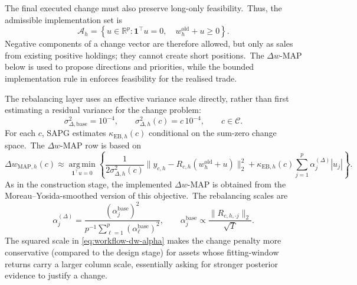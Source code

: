 \documentclass[11pt]{article}
\newcommand{\argmin}{\operatorname*{arg\,min}}
\newcommand{\one}{\mathbf{1}}
\begin{document}
The final executed change must also preserve long-only feasibility.\ Thus, the admissible implementation set is
\begin{equation}
  \mathcal A_h
  =
  \left\{
  u\in\mathbb R^p:
  \one^\top u=0,
  \quad
  w_h^{\mathrm{old}}+u\geq0
  \right\}.
  \label{eq:workflow-admissible-change-set}
\end{equation}
Negative components of a change vector are therefore allowed, but only as sales from existing positive holdings; they cannot create short positions.\ The \(\Delta w\)-MAP below is used to propose directions and priorities, while the bounded implementation rule in  enforces feasibility for the realised trade.

The rebalancing layer uses an effective variance scale directly, rather than first estimating a residual variance for the change problem:\
\begin{equation}
  \sigma^2_{\Delta,\mathrm{base}}=10^{-4},
  \qquad
  \sigma^2_{\Delta,h}(c)=c\,10^{-4},
  \qquad c\in\mathcal C.
  \label{eq:workflow-dw-c-grid}
\end{equation}
For each \(c\), SAPG estimates \(\kappa_{\mathrm{EB},h}(c)\) conditional on the sum-zero change space.\ The \(\Delta w\)-MAP row is based on
\begin{equation}
  \Delta w_{\mathrm{MAP},h}(c)
  \approx
  \argmin_{\one^\top u=0}
  \left\{
  \frac{1}{2\sigma^2_{\Delta,h}(c)}
  \|y_{c,h}-R_{c,h}(w_h^{\mathrm{old}}+u)\|_2^2
  +\kappa_{\mathrm{EB},h}(c)
  \sum_{j=1}^p \alpha^{(\Delta)}_j|u_j|
  \right\}.
  \label{eq:workflow-dw-map}
\end{equation}
As in the construction stage, the implemented \(\Delta w\)-MAP is obtained from the Moreau--Yosida-smoothed version of this objective.\ The rebalancing scales are
\begin{equation}
  \alpha^{(\Delta)}_j
  =
  \frac{\left(\alpha^{\mathrm{base}}_j\right)^2}
       {p^{-1}\sum_{\ell=1}^p\left(\alpha^{\mathrm{base}}_\ell\right)^2},
  \qquad
  \alpha^{\mathrm{base}}_j\propto\frac{\|R_{c,h,\cdot j}\|_2}{\sqrt T}.
  \label{eq:workflow-dw-alpha}
\end{equation}
The squared scale in \eqref{eq:workflow-dw-alpha} makes the change penalty more conservative (compared to the design stage) for assets whose fitting-window returns carry a larger column scale, essentially asking for stronger posterior evidence to justify a change.
\end{document}
